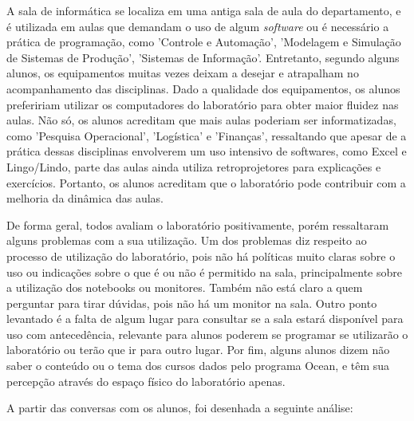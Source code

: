 A sala de informática se localiza em uma antiga sala de aula do departamento, e é utilizada em aulas que demandam o uso de algum \textit{software} ou é necessário a prática de programação, como 'Controle e Automação', 'Modelagem e Simulação de Sistemas de Produção', 'Sistemas de Informação'. Entretanto, segundo alguns alunos, os equipamentos muitas vezes deixam a desejar e atrapalham no acompanhamento das disciplinas. Dado a qualidade dos equipamentos, os alunos prefeririam utilizar os computadores do laboratório para obter maior fluidez nas aulas. Não só, os alunos acreditam que mais aulas poderiam ser informatizadas, como 'Pesquisa Operacional', 'Logística' e 'Finanças', ressaltando que apesar de a prática dessas disciplinas envolverem um uso intensivo de softwares, como Excel e Lingo/Lindo, parte das aulas ainda utiliza retroprojetores para explicações e exercícios. Portanto, os alunos acreditam que o laboratório pode contribuir com a melhoria da dinâmica das aulas.

De forma geral, todos avaliam o laboratório positivamente, porém ressaltaram alguns problemas com a sua utilização. Um dos problemas diz respeito ao processo de utilização do laboratório, pois não há políticas muito claras sobre o uso ou indicações sobre o que é ou não é permitido na sala, principalmente sobre a utilização dos notebooks ou monitores. Também não está claro a quem perguntar para tirar dúvidas, pois não há um monitor na sala. Outro ponto levantado é a falta de algum lugar para consultar se a sala estará disponível para uso com antecedência, relevante para alunos poderem se programar se utilizarão o laboratório ou terão que ir para outro lugar. Por fim, alguns alunos dizem não saber o conteúdo ou o tema dos cursos dados pelo programa Ocean, e têm sua percepção através do espaço físico do laboratório apenas. 

A partir das conversas com os alunos, foi desenhada a seguinte análise:

